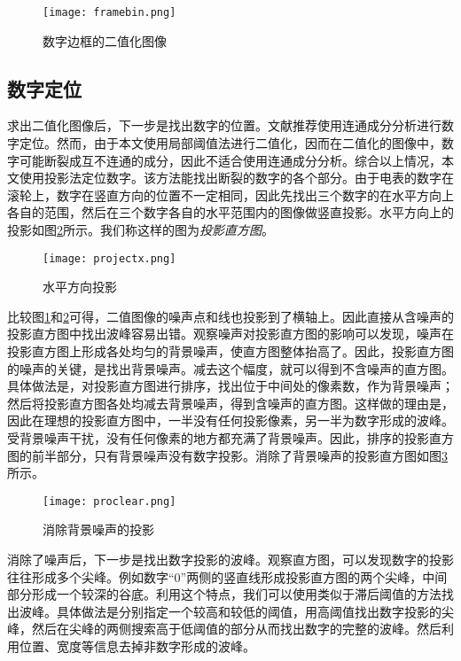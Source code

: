\begin{figure}[h]
  \centering
  \texttt{[image: framebin.png]}
  \caption{数字边框的二值化图像}
  \label{fig:framebin}
\end{figure}

\subsection{数字定位}\label{sec:charseg}


求出二值化图像后，下一步是找出数字的位置。文献\cite{cookbook}推荐使用连通成分分析进行数字定位。然而，由于本文使用局部阈值法进行二值化，因而在二值化的图像中，数字可能断裂成互不连通的成分，因此不适合使用连通成分分析。综合以上情况，本文使用投影法定位数字。该方法能找出断裂的数字的各个部分。由于电表的数字在滚轮上，数字在竖直方向的位置不一定相同，因此先找出三个数字的在水平方向上各自的范围，然后在三个数字各自的水平范围内的图像做竖直投影。水平方向上的投影如图\ref{fig:projectx}所示。我们称这样的图为\emph{投影直方图}。
\begin{figure}[h]
  \centering
  \texttt{[image: projectx.png]}
  \caption{水平方向投影}
  \label{fig:projectx}
\end{figure}

比较图\ref{fig:framebin}和\ref{fig:projectx}可得，二值图像的噪声点和线也投影到了横轴上。因此直接从含噪声的投影直方图中找出波峰容易出错。观察噪声对投影直方图的影响可以发现，噪声在投影直方图上形成各处均匀的背景噪声，使直方图整体抬高了。因此，投影直方图的噪声的关键，是找出背景噪声。减去这个幅度，就可以得到不含噪声的直方图。具体做法是，对投影直方图进行排序，找出位于中间处的像素数，作为背景噪声；然后将投影直方图各处均减去背景噪声，得到含噪声的直方图。这样做的理由是，因此在理想的投影直方图中，一半没有任何投影像素，另一半为数字形成的波峰。受背景噪声干扰，没有任何像素的地方都充满了背景噪声。因此，排序的投影直方图的前半部分，只有背景噪声没有数字投影。消除了背景噪声的投影直方图如图\ref{fig:proclear}所示。
\begin{figure}[h]
  \centering
  \texttt{[image: proclear.png]}
  \caption{消除背景噪声的投影}
  \label{fig:proclear}
\end{figure}

消除了噪声后，下一步是找出数字投影的波峰。观察直方图，可以发现数字的投影往往形成多个尖峰。例如数字“0”两侧的竖直线形成投影直方图的两个尖峰，中间部分形成一个较深的谷底。利用这个特点，我们可以使用类似于滞后阈值的方法找出波峰。具体做法是分别指定一个较高和较低的阈值，用高阈值找出数字投影的尖峰，然后在尖峰的两侧搜索高于低阈值的部分从而找出数字的完整的波峰。然后利用位置、宽度等信息去掉非数字形成的波峰。

